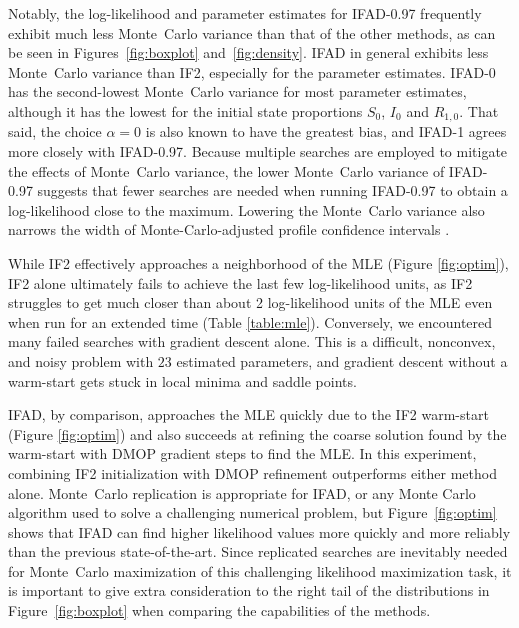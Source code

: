 \documentclass[11pt]{article}
\begin{document}
Notably, the log-likelihood and parameter estimates for IFAD-0.97 frequently exhibit much less Monte~Carlo variance than that of the other methods, as can be seen in Figures~\ref{fig:boxplot} and~\ref{fig:density}. 
IFAD in general exhibits less Monte~Carlo variance than IF2, especially for the parameter estimates. 
IFAD-0 has the second-lowest Monte~Carlo variance for most parameter estimates, although it has the lowest for the initial state proportions $S_0$, $I_0$ and $R_{1,0}$.
That said, the choice $\alpha=0$ is also known to have the greatest bias, and IFAD-1 agrees more closely with IFAD-0.97. 
Because multiple searches are employed to mitigate the effects of Monte~Carlo variance, the lower Monte~Carlo variance of IFAD-0.97 suggests that fewer searches are needed when running IFAD-0.97 to obtain a log-likelihood close to the maximum. 
Lowering the Monte~Carlo variance also narrows the width of Monte-Carlo-adjusted profile confidence intervals \citep{ionides17}.


While IF2 effectively approaches a neighborhood of the MLE (Figure \ref{fig:optim}), IF2 alone ultimately fails to achieve the last few log-likelihood units, as IF2 struggles to get much closer than about 2 log-likelihood units of the MLE even when run for an extended time (Table \ref{table:mle}).
Conversely, we encountered many failed searches with gradient descent alone. 
This is a difficult, nonconvex, and noisy problem with $23$ estimated parameters, and gradient descent without a warm-start gets stuck in local minima and saddle points.

IFAD, by comparison, approaches the MLE quickly due to the IF2 warm-start (Figure \ref{fig:optim}) and also succeeds at refining the coarse solution found by the warm-start with DMOP gradient steps to find the MLE.
In this experiment, combining IF2 initialization with DMOP refinement outperforms either method alone.
Monte~Carlo replication is appropriate for IFAD, or any Monte Carlo algorithm used to solve a challenging numerical problem, but Figure~\ref{fig:optim} shows that IFAD can find higher likelihood values more quickly and more reliably than the previous state-of-the-art. 
Since replicated searches are inevitably needed for Monte~Carlo maximization of this challenging likelihood maximization task, it is important to give extra consideration to the right tail of the distributions in Figure~\ref{fig:boxplot} when comparing the capabilities of the methods. 
\end{document}
